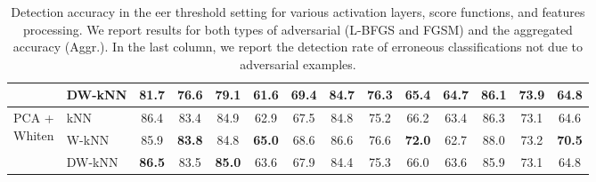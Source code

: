 \begin{table}
\begin{tabularx}{\linewidth}{Xlcccccccccccc}
                                                         & DW-kNN & 81.7          & 76.6          & 79.1          & 61.6          & 69.4          & 84.7          & 76.3          & 65.4          & 64.7          & 86.1          & 73.9          & 64.8          \\ \midrule
\multirow{3}{*}{\parbox[c][1.2cm]{1.2cm}{PCA +\\Whiten}} &    kNN & 86.4          & 83.4          & 84.9          & 62.9          & 67.5          & 84.8          & 75.2          & 66.2          & 63.4          & 86.3          & 73.1          & 64.6          \\
                                                         &  W-kNN & 85.9          & \textbf{83.8} & 84.8          & \textbf{65.0} & 68.6          & 86.6          & 76.6          & \textbf{72.0} & 62.7          & 88.0          & 73.2          & \textbf{70.5} \\
                                                         & DW-kNN & \textbf{86.5} & 83.5          & \textbf{85.0} & 63.6          & 67.9          & 84.4          & 75.3          & 66.0          & 63.6          & 85.9          & 73.1          & 64.8          \\
\bottomrule
\end{tabularx}
\caption{Detection accuracy in the \gls{eer} threshold setting for various activation layers, score functions, and features processing.
We report results for both types of adversarial (L-BFGS and FGSM) and the aggregated accuracy (Aggr.).
In the last column, we report the detection rate of erroneous classifications not due to adversarial examples.}
\label{tab:adv:eer}
\end{table}

